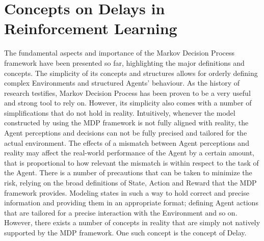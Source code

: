     \section{Concepts on Delays in Reinforcement Learning}
    \label{defproblem:delays}
        The fundamental aspects and importance of the Markov Decision Process framework have been presented so far, highlighting the major definitions and concepts. The simplicity of its concepts and structures allows for orderly defining complex Environments and structured Agents' behaviour. As the history of research testifies, Markov Decision Process has been proven to be a very useful and strong tool to rely on. \newline
        However, its simplicity also comes with a number of simplifications that do not hold in reality. Intuitively, whenever the model constructed by using the MDP framework is not fully aligned with reality, the Agent perceptions and decisions can not be fully precised and tailored for the actual environment. The effects of a mismatch between Agent perceptions and reality may affect the real-world performance of the Agent by a certain amount, that is proportional to how relevant the mismatch is within respect to the task of the Agent. \newline
        There is a number of precautions that can be taken to minimize the risk, relying on the broad definitions of State, Action and Reward that the MDP framework provides. Modeling states in such a way to hold correct and precise information and providing them in an appropriate format; defining Agent actions that are tailored for a precise interaction with the Environment and so on. However, there exists a number of concepts in reality that are simply not natively supported by the MDP framework. One such concept is the concept of Delay.
        
